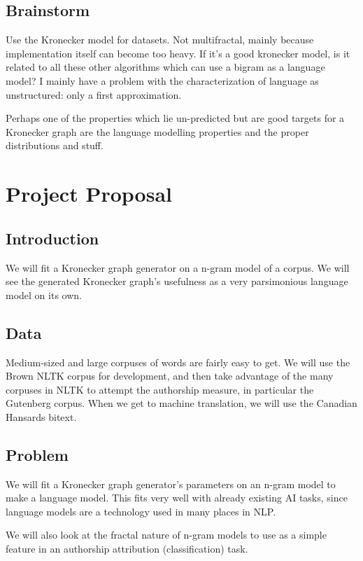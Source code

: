 \documentclass[12pt]{article}
\begin{document}
\subsection{Brainstorm}

Use the Kronecker model for datasets. Not multifractal, mainly because implementation itself can become too heavy. If it's a good kronecker model, is it related to all these other algorithms which can use a bigram as a language model? I mainly have a problem with the characterization of language as unstructured: only a first approximation.

Perhaps one of the properties which lie un-predicted but are good targets for a Kronecker graph are the language modelling properties and the proper distributions and stuff.

\section{Project Proposal}

\subsection{Introduction}
We will fit a Kronecker graph generator on a n-gram model of a corpus. We will see the generated Kronecker graph's usefulness as a very parsimonious language model on its own.
\subsection{Data}
Medium-sized and large corpuses of words are fairly easy to get. We will use the Brown NLTK corpus for development, and then take advantage of the many corpuses in NLTK to attempt the authorship measure, in particular the Gutenberg corpus. When we get to machine translation, we will use the Canadian Hansards bitext.
\subsection{Problem}
We will fit a Kronecker graph generator's parameters on an n-gram model to make a language model. This fits very well with already existing AI tasks, since language models are a technology used in many places in NLP.

We will also look at the fractal nature of n-gram models to use as a simple feature in an authorship attribution (classification) task.
\end{document}
